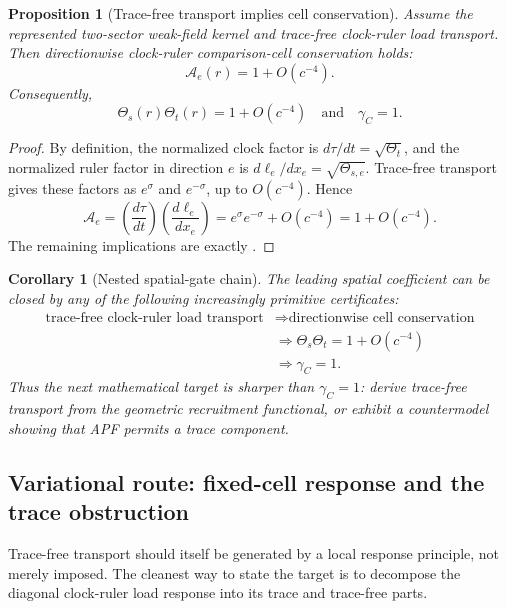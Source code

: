 \documentclass[11pt]{article}
\newtheorem{proposition}[theorem]{Proposition}
\newtheorem{corollary}[theorem]{Corollary}
\theoremstyle{remark}
\begin{document}
\begin{proposition}[Trace-free transport implies cell conservation]
\label{prop:trace-free-implies-cell}
Assume the represented two-sector weak-field kernel and trace-free clock-ruler load transport.  Then directionwise clock-ruler comparison-cell conservation holds:
\[
        \mathcal A_e(r)=1+O(c^{-4}).
\]
Consequently,
\[
        \Theta_s(r)\Theta_t(r)=1+O(c^{-4})
        \quad\text{and}\quad
        \gamma_C=1.
\]
\end{proposition}

\begin{proof}
By definition, the normalized clock factor is \(d\tau/dt=\sqrt{\Theta_t}\), and the normalized ruler factor in direction \(e\) is \(d\ell_e/dx_e=\sqrt{\Theta_{s,e}}\).  Trace-free transport gives these factors as \(e^{\sigma}\) and \(e^{-\sigma}\), up to \(O(c^{-4})\).  Hence
\[
        \mathcal A_e
        =\left(\frac{d\tau}{dt}\right)
         \left(\frac{d\ell_e}{dx_e}\right)
        =e^{\sigma}e^{-\sigma}+O(c^{-4})
        =1+O(c^{-4}).
\]
The remaining implications are exactly .
\end{proof}

\begin{corollary}[Nested spatial-gate chain]
\label{cor:nested-spatial-chain}
The leading spatial coefficient can be closed by any of the following increasingly primitive certificates:
\[
\begin{aligned}
        \text{trace-free clock-ruler load transport}
        &\Longrightarrow
        \text{directionwise cell conservation}\\
        &\Longrightarrow
        \Theta_s\Theta_t=1+O(c^{-4})\\
        &\Longrightarrow
        \gamma_C=1.
\end{aligned}
\]
Thus the next mathematical target is sharper than \(\gamma_C=1\): derive trace-free transport from the geometric recruitment functional, or exhibit a countermodel showing that APF permits a trace component.
\end{corollary}


\subsection{Variational route: fixed-cell response and the trace obstruction}

Trace-free transport should itself be generated by a local response principle, not merely imposed.  The cleanest way to state the target is to decompose the diagonal clock-ruler load response into its trace and trace-free parts.
\end{document}
